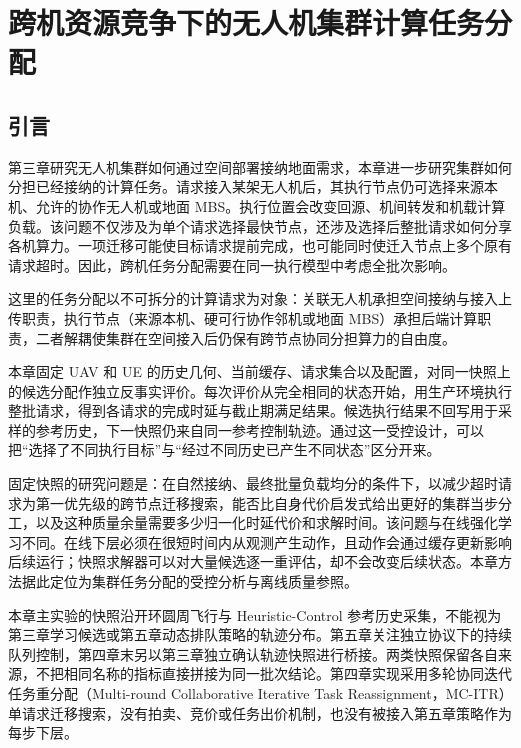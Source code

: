 \chapter{跨机资源竞争下的无人机集群计算任务分配}
\label{cha:fixed-offload}

\section{引言}
\label{sec:ch4-intro}
\label{sec:fixed-snapshot-problem}

第三章研究无人机集群如何通过空间部署接纳地面需求，本章进一步研究集群如何分担已经接纳的计算任务\cite{zhou2018computation,bai2019energy,yuan2022computation}。请求接入某架无人机后，其执行节点仍可选择来源本机、允许的协作无人机或地面 MBS\cite{zhou2022twotimescale,kim2023joint,tang2025collaborative}。执行位置会改变回源、机间转发和机载计算负载。该问题不仅涉及为单个请求选择最快节点，还涉及选择后整批请求如何分享各机算力\cite{chen2016efficient,huang2026madr,you2026soft}。一项迁移可能使目标请求提前完成，也可能同时使迁入节点上多个原有请求超时。因此，跨机任务分配需要在同一执行模型中考虑全批次影响。

这里的任务分配以不可拆分的计算请求为对象：关联无人机承担空间接纳与接入上传职责，执行节点（来源本机、硬可行协作邻机或地面 MBS）承担后端计算职责，二者解耦使集群在空间接入后仍保有跨节点协同分担算力的自由度。

本章固定 UAV 和 UE 的历史几何、当前缓存、请求集合以及配置，对同一快照上的候选分配作独立反事实评价。每次评价从完全相同的状态开始，用生产环境执行整批请求，得到各请求的完成时延与截止期满足结果。候选执行结果不回写用于采样的参考历史，下一快照仍来自同一参考控制轨迹。通过这一受控设计，可以把“选择了不同执行目标”与“经过不同历史已产生不同状态”区分开来。

固定快照的研究问题是：在自然接纳、最终批量负载均分的条件下，以减少超时请求为第一优先级的跨节点迁移搜索，能否比自身代价启发式给出更好的集群当步分工，以及这种质量余量需要多少归一化时延代价和求解时间。该问题与在线强化学习不同。在线下层必须在很短时间内从观测产生动作，且动作会通过缓存更新影响后续运行；快照求解器可以对大量候选逐一重评估，却不会改变后续状态。本章方法据此定位为集群任务分配的受控分析与离线质量参照。

本章主实验的快照沿开环圆周飞行与 Heuristic-Control 参考历史采集，不能视为第三章学习候选或第五章动态排队策略的轨迹分布。第五章关注独立协议下的持续队列控制，第四章末另以第三章独立确认轨迹快照进行桥接。两类快照保留各自来源，不把相同名称的指标直接拼接为同一批次结论。第四章实现采用多轮协同迭代任务重分配（Multi-round Collaborative Iterative Task Reassignment，MC-ITR）单请求迁移搜索，没有拍卖、竞价或任务出价机制，也没有被接入第五章策略作为每步下层。


